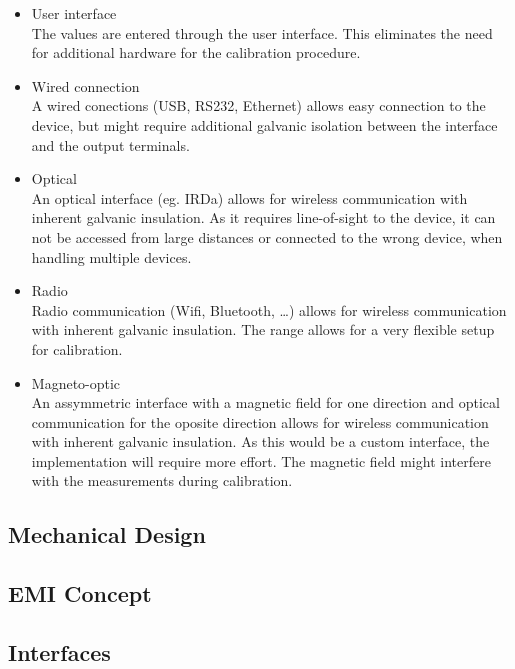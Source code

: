 \begin{itemize}
    \item User interface
        \\
        The values are entered through the user interface. This eliminates the need for additional hardware for the calibration procedure. 
    \item Wired connection
        \\
        A wired conections (\ac{USB}, RS232, Ethernet) allows easy connection to the device, but might require additional galvanic isolation between the interface and the output terminals. 
    \item Optical
        \\
        An optical interface (eg. IRDa) allows for wireless communication with inherent galvanic insulation. As it requires line-of-sight to the device, it can not be accessed from large distances or connected to the wrong device, when handling multiple devices. 
    \item Radio
        \\
        Radio communication (Wifi, Bluetooth, \ldots) allows for wireless communication with inherent galvanic insulation. The range allows for a very flexible setup for calibration. 
    \item Magneto-optic
        \\
        An assymmetric interface with a magnetic field for one direction and optical communication for the oposite direction allows for wireless communication with inherent galvanic insulation. As this would be a custom interface, the implementation will require more effort. The magnetic field might interfere with the measurements during calibration. 
\end{itemize}

\subsection{Mechanical Design}

\FloatBarrier
\subsection{EMI Concept}

\FloatBarrier
\subsection{Interfaces}

